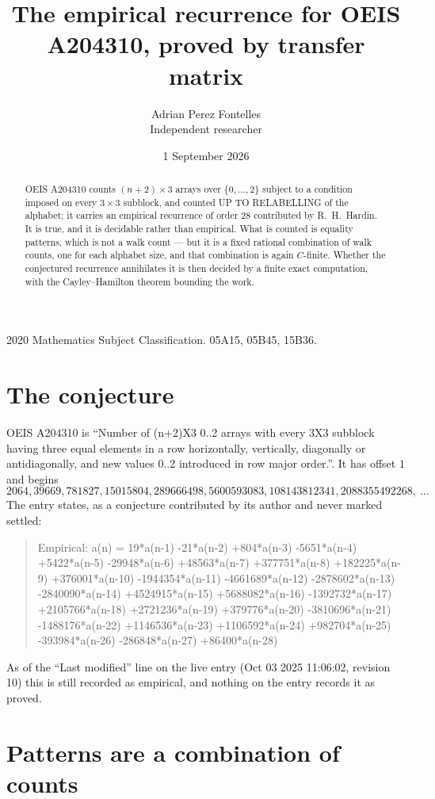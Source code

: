 \documentclass[11pt,a4paper]{article}
\title{The empirical recurrence for OEIS A204310, proved by transfer matrix}
\author{Adrian Perez Fontelles\\ \small Independent researcher}
\date{1 September 2026}
\theoremstyle{plain}
\theoremstyle{definition}
\begin{document}
\maketitle

\begin{abstract}
OEIS A204310 counts $(n+2)\times3$ arrays over $\{0,\dots,2\}$ subject to a condition imposed on
every $3\times3$ subblock, and counted UP TO RELABELLING of the
alphabet; it carries an empirical recurrence of order $28$ contributed by
R.~H.~Hardin. It is true, and it is decidable rather than empirical. What is counted is
equality patterns, which is not a walk count --- but it is a fixed rational combination of
walk counts, one for each alphabet size, and that combination is again $C$-finite. Whether the
conjectured recurrence annihilates it is then decided by a finite exact computation, with the
Cayley--Hamilton theorem bounding the work.
\end{abstract}

\noindent\small 2020 Mathematics Subject Classification. 05A15, 05B45, 15B36.\normalsize

\section{The conjecture}

OEIS A204310 is ``Number of (n+2)X3 0..2 arrays with every 3X3 subblock having three equal elements in a row horizontally, vertically, diagonally or antidiagonally, and new values 0..2 introduced in row major order.''. It has offset $1$ and begins
\[
2064, 39669, 781827, 15015804, 289666498, 5600593083, 108143812341, 2088355492268,\ \dots
\]
The entry states, as a conjecture contributed by its author and never marked settled:
\begin{quote}
Empirical: a(n) = 19*a(n-1) -21*a(n-2) +804*a(n-3) -5651*a(n-4) +5422*a(n-5) -29948*a(n-6) +48563*a(n-7) +377751*a(n-8) +182225*a(n-9) +376001*a(n-10) -1944354*a(n-11) -4661689*a(n-12) -2878602*a(n-13) -2840090*a(n-14) +4524915*a(n-15) +5688082*a(n-16) -1392732*a(n-17) +2105766*a(n-18) +2721236*a(n-19) +379776*a(n-20) -3810696*a(n-21) -1488176*a(n-22) +1146536*a(n-23) +1106592*a(n-24) +982704*a(n-25) -393984*a(n-26) -286848*a(n-27) +86400*a(n-28)
\end{quote}
As of the ``Last modified'' line on the live entry (Oct 03 2025 11:06:02, revision 10) this is still
recorded as empirical, and nothing on the entry records it as proved.

\section{Patterns are a combination of counts}
\end{document}
